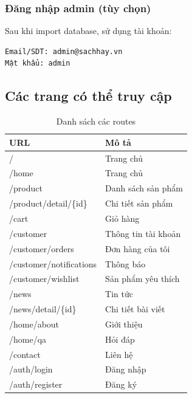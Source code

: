 \subsubsection{Đăng nhập admin (tùy chọn)}

Sau khi import database, sử dụng tài khoản:
\begin{verbatim}
Email/SDT: admin@sachhay.vn
Mật khẩu: admin
\end{verbatim}

\subsection{Các trang có thể truy cập}

\begin{table}[H]
\centering
\begin{tabular}{|l|l|}
\hline
\textbf{URL} & \textbf{Mô tả} \\
\hline
/ & Trang chủ \\
/home & Trang chủ \\
/product & Danh sách sản phẩm \\
/product/detail/\{id\} & Chi tiết sản phẩm \\
/cart & Giỏ hàng \\
/customer & Thông tin tài khoản \\
/customer/orders & Đơn hàng của tôi \\
/customer/notifications & Thông báo \\
/customer/wishlist & Sản phẩm yêu thích \\
/news & Tin tức \\
/news/detail/\{id\} & Chi tiết bài viết \\
/home/about & Giới thiệu \\
/home/qa & Hỏi đáp \\
/contact & Liên hệ \\
/auth/login & Đăng nhập \\
/auth/register & Đăng ký \\
\hline
\end{tabular}
\caption{Danh sách các routes}
\label{tab:routes}
\end{table}

